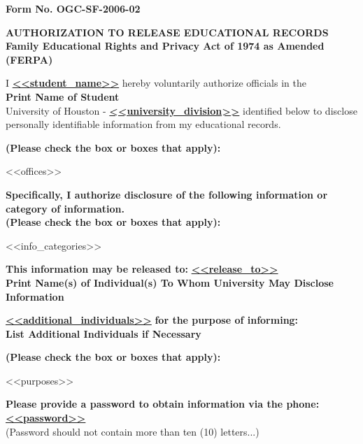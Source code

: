 \documentclass[12pt]{article}
\begin{document}
\noindent \textbf{Form No. OGC-SF-2006-02}

\begin{center}
    {\fontsize{11pt}{13pt} \selectfont \textbf{AUTHORIZATION TO RELEASE EDUCATIONAL RECORDS}}\\
    {\fontsize{11pt}{13pt} \selectfont \textbf{Family Educational Rights and Privacy Act of 1974 as Amended (FERPA)}}
\end{center}

I \underline{\textbf{<<student_name>>}} hereby voluntarily authorize officials in the\\
\textbf{Print Name of Student} \\

University of Houston - \underline{\textbf{<<university_division>>}} identified below to disclose personally identifiable information from my educational records.

\textbf{(Please check the box or boxes that apply):}
\begin{list}{}{\leftmargin=0pt \itemindent=0pt \setlength{\itemsep}{0pt}}
    <<offices>>
\end{list}

\textbf{Specifically, I authorize disclosure of the following information or category of information.}\\
\textbf{(Please check the box or boxes that apply):}
\begin{list}{}{\leftmargin=0pt \itemindent=0pt \setlength{\itemsep}{0pt}}
    <<info_categories>>
\end{list}

\textbf{This information may be released to:} \underline{\textbf{<<release_to>>}}\\
\textbf{Print Name(s) of Individual(s) To Whom University May Disclose Information}

\underline{\textbf{<<additional_individuals>>}} \textbf{for the purpose of informing:}\\
\textbf{List Additional Individuals if Necessary}

\textbf{(Please check the box or boxes that apply):}
\begin{list}{}{\leftmargin=0pt \itemindent=0pt \setlength{\itemsep}{0pt}}
    <<purposes>>
\end{list}

\textbf{Please provide a password to obtain information via the phone:} \underline{\textbf{<<password>>}}\\
\footnotesize (Password should not contain more than ten (10) letters...)
\end{document}
